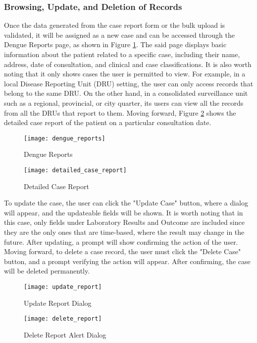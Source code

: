 \subsubsection{Browsing, Update, and Deletion of Records}
Once the data generated from the case report form or the bulk upload is validated, it will be assigned as a new case and can be accessed through the Dengue Reports page, as shown in Figure \ref{fig:dengue_reports}. The said page displays basic information about the patient related to a specific case, including their name, address, date of consultation, and clinical and case classifications. It is also worth noting that it only shows cases the user is permitted to view. For example, in a local Disease Reporting Unit (DRU) setting, the user can only access records that belong to the same DRU. On the other hand, in a consolidated surveillance unit such as a regional, provincial, or city quarter, its users can view all the records from all the DRUs that report to them. Moving forward, Figure \ref{fig:detailed_case_report} shows the detailed case report of the patient on a particular consultation date. 
\begin{figure}[H]
	\centering
	\texttt{[image: dengue\_reports]}
	\caption{Dengue Reports}
	\label{fig:dengue_reports}
\end{figure}
\begin{figure}[H]
	\centering
	\texttt{[image: detailed\_case\_report]}
	\caption{Detailed Case Report}
	\label{fig:detailed_case_report}
\end{figure}

To update the case, the user can click the "Update Case" button, where a dialog will appear, and the updateable fields will be shown. It is worth noting that in this case, only fields under Laboratory Results and Outcome are included since they are the only ones that are time-based, where the result may change in the future. After updating, a prompt will show confirming the action of the user. Moving forward, to delete a case record, the user must click the "Delete Case" button, and a prompt verifying the action will appear. After confirming, the case will be deleted permanently.

\begin{figure}[H]
	\centering
	\texttt{[image: update\_report]}
	\caption{Update Report Dialog}
	\label{fig:update_report}
\end{figure}
\begin{figure}[H]
	\centering
	\texttt{[image: delete\_report]}
	\caption{Delete Report Alert Dialog}
	\label{fig:delete_report}
\end{figure}

